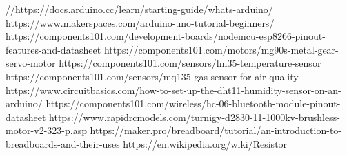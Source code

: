 \documentclass[conference]{IEEEtran}
\begin{document}



\begin{thebibliography}{00}

 //https://docs.arduino.cc/learn/starting-guide/whats-arduino/
https://www.makerspaces.com/arduino-uno-tutorial-beginners/
 https://components101.com/development-boards/nodemcu-esp8266-pinout-features-and-datasheet
 https://components101.com/motors/mg90s-metal-gear-servo-motor
 https://components101.com/sensors/lm35-temperature-sensor
 https://components101.com/sensors/mq135-gas-sensor-for-air-quality
 https://www.circuitbasics.com/how-to-set-up-the-dht11-humidity-sensor-on-an-arduino/
 https://components101.com/wireless/hc-06-bluetooth-module-pinout-datasheet
 https://www.rapidrcmodels.com/turnigy-d2830-11-1000kv-brushless-motor-v2-323-p.asp
 https://maker.pro/breadboard/tutorial/an-introduction-to-breadboards-and-their-uses
 https://en.wikipedia.org/wiki/Resistor

\end{thebibliography}
\end{document}
